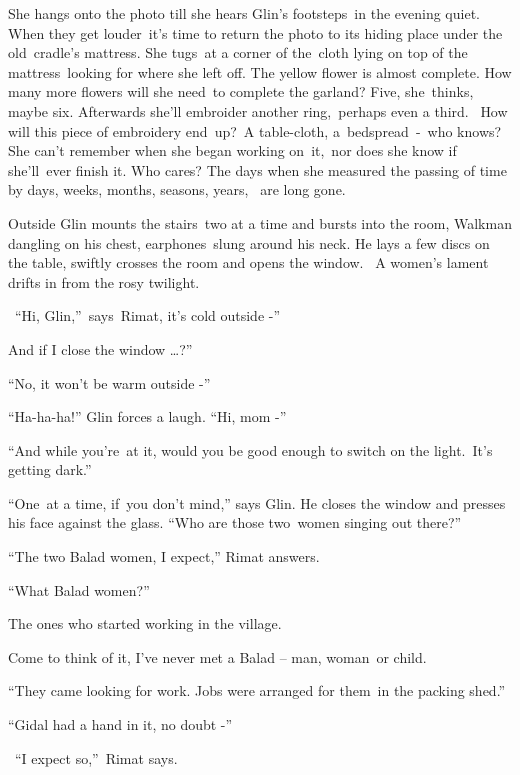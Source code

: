 \documentclass[twoside,11pt]{book}
\begin{document}
S{he hangs onto the photo till she hears Glin's footsteps\ in the
evening quiet. When }they get louder\ {it's time to return the photo
to its hiding place under the old\ cradle's mattress. She tugs\ at a corner of
the}{\ }cloth lying on top of the
mattress{\ looking for where she left off. The yellow flower is almost
complete. How many more flowers will she need}\ {to complete the
garland? Five, she\ }thinks{, maybe six. Afterwards she'll embroider
another }ring,\ p{erhaps even a third.~
}How{ will this piece of embroidery
end\ }up?{\ }A{
table{}-cloth,} a\ {bedspread\ {}-\ who knows? She can't remember when
she began working on\ }it,\ nor does she know if she'll\ {ever finish
it. Who cares? }The days when she measured the passing of time by days, weeks, months, seasons, years, \ are long
gone.\ 

{Outside Glin }mounts the
stairs\ {two at a time and bursts into the room, Walkman dangling on
his chest, earphones~}slung{ around his neck. He lays a few discs on
the table, swiftly crosses the room and opens the window.~ A women's lament drifts in from the rosy twilight.}

{\ {}``}Hi,{
Glin,''\ says\ Rimat, {\textquotedbl}it's cold outside -{}''}

{\textquotedbl}And if I{ close the window {\dots}?{}''}

{{}``No, it won't be warm outside -{}''}

{{}``Ha-ha-ha!'' Glin }forces a
laugh{. ``Hi, mom -{}''\ }

{{}``And while you're\ at it, }would you be good enough to switch on
the light.\ {It's getting dark.{}''}

{{}``One~at a time, if~you }don't
mind{,'' says Glin. He closes the window and presses his face against
the glass}.{ ``Who are those
}two{\ }{women singing out
there?''}

{{}``The two Balad women, I
}expect{,'' Rimat answers.}

{{}``What Balad women?''}

{\textquotedbl}The ones who started working{ in the
village.{\textquotedbl}\ \ \ \ \ \ \ \ }

{{\textquotedbl}Come to think of it, I've never met a Balad -- man,
woman\ }or child.{\textquotedbl}

{{}``They came looking for work. Jobs were arranged for them\ in the
packing }shed{.''}

{{}``Gidal had a hand in it, no doubt -{}''}

{~``}I expect
so{,''~Rimat says.\ }
\end{document}
